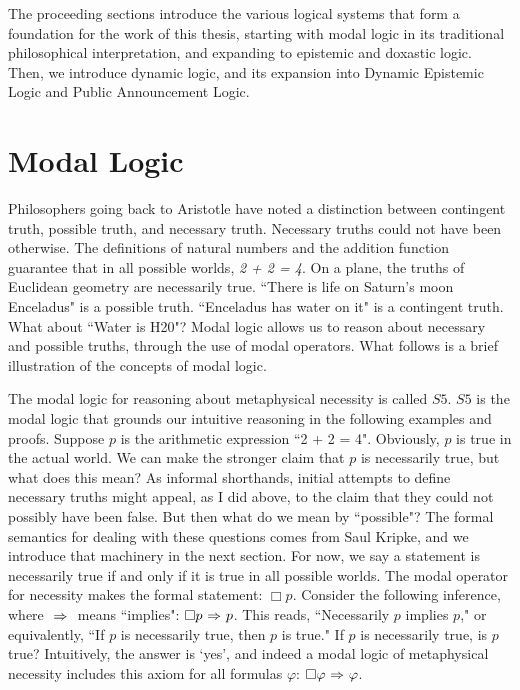 The proceeding sections introduce the various logical systems that form a foundation for the work of this thesis, starting with modal logic in its traditional philosophical interpretation, and expanding to epistemic and doxastic logic. Then, we introduce dynamic logic, and its expansion into Dynamic Epistemic Logic and Public Announcement Logic.

\section{Modal Logic}
Philosophers going back to Aristotle have noted a distinction between contingent truth, possible truth, and necessary truth. Necessary truths could not have been otherwise. The definitions of natural numbers and the addition function guarantee that in all possible worlds, \emph{2 + 2 = 4}. On a plane, the truths of Euclidean geometry are necessarily true. ``There is life on Saturn's moon Enceladus" is a possible truth. ``Enceladus has water on it" is a contingent truth. What about ``Water is H20"? Modal logic allows us to reason about necessary and possible truths, through the use of modal operators. What follows is a brief illustration of the concepts of modal logic.

The modal logic for reasoning about metaphysical necessity is called $\mathit{S5}$. $\mathit{S5}$ is the modal logic that grounds our intuitive reasoning in the following examples and proofs. Suppose $p$ is the arithmetic expression ``2 + 2 = 4". Obviously, $p$ is true in the actual world. We can make the stronger claim that $p$ is necessarily true, but what does this mean? As informal shorthands, initial attempts to define necessary truths might appeal, as I did above, to the claim that they could not possibly have been false. But then what do we mean by ``possible"? The formal semantics for dealing with these questions comes from Saul Kripke, and we introduce that machinery in the next section. For now, we say a statement is necessarily true if and only if it is true in all possible worlds. The modal operator for necessity makes the formal statement: $\Box p$. Consider the following inference, where ${\ \Rightarrow \ }$ means ``implies": $\Box p {\ \Rightarrow \ } p$. This reads, ``Necessarily $p$ implies $p$," or equivalently, ``If $p$ is necessarily true, then $p$ is true." If $p$ is necessarily true, is $p$ true? Intuitively, the answer is `yes', and indeed a modal logic of metaphysical necessity includes this axiom for all formulas $\varphi$: $\Box \varphi {\ \Rightarrow \ } \varphi$. 

